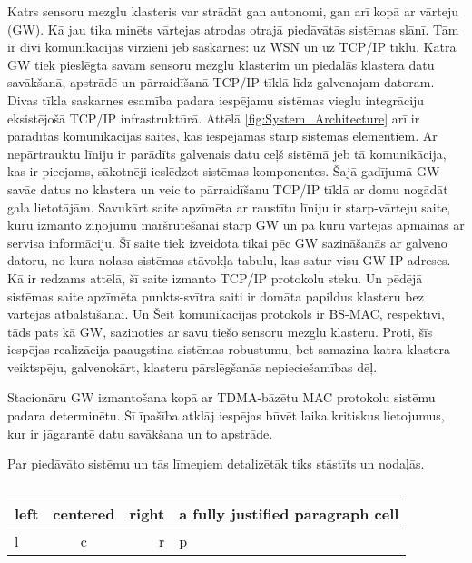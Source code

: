 Katrs sensoru mezglu klasteris var strādāt gan autonomi, gan arī kopā ar vārteju (GW). Kā jau tika minēts vārtejas atrodas otrajā piedāvātās sistēmas slānī. Tām ir divi komunikācijas virzieni jeb saskarnes: uz WSN un uz TCP/IP tīklu. Katra GW tiek pieslēgta savam sensoru mezglu klasterim un piedalās klastera datu savākšanā, apstrādē un pārraidīšanā TCP/IP tīklā līdz galvenajam datoram. Divas tīkla saskarnes esamība padara iespējamu sistēmas vieglu integrāciju eksistējošā TCP/IP infrastruktūrā. Attēlā \upshape \ref{fig:System_Architecture} arī ir parādītas komunikācijas saites, kas iespējamas starp sistēmas elementiem. Ar nepārtrauktu līniju ir parādīts galvenais datu ceļš sistēmā jeb tā komunikācija, kas ir pieejams, sākotnēji ieslēdzot sistēmas komponentes. Šajā gadījumā GW savāc datus no klastera un veic to pārraidīšanu TCP/IP tīklā ar domu nogādāt gala lietotājām. Savukārt saite apzīmēta ar raustītu līniju ir starp-vārteju saite, kuru izmanto ziņojumu maršrutēšanai starp GW un pa kuru vārtejas apmainās ar servisa informāciju. Šī saite tiek izveidota tikai pēc GW sazināšanās ar galveno datoru, no kura nolasa sistēmas stāvokļa tabulu, kas satur visu GW IP adreses. Kā ir redzams attēlā, šī saite izmanto TCP/IP protokolu steku. Un pēdējā sistēmas saite apzīmēta punkts-svītra saiti ir domāta papildus klasteru bez vārtejas atbalstīšanai. Un Šeit komunikācijas protokols ir BS-MAC, respektīvi, tāds pats kā GW, sazinoties ar savu tiešo sensoru mezglu klasteru. Proti, šīs iespējas realizācija paaugstina sistēmas robustumu, bet samazina katra klastera veiktspēju, galvenokārt, klasteru pārslēgšanās nepieciešamības dēļ. 

 

Stacionāru GW izmantošana kopā ar TDMA-bāzētu MAC protokolu sistēmu padara determinētu. Šī īpašība atklāj iespējas būvēt laika kritiskus lietojumus, kur ir jāgarantē datu savākšana un to apstrāde.

Par piedāvāto sistēmu un tās līmeņiem detalizētāk tiks stāstīts un nodaļās.

\begin{table}
\caption{\textbf{\fontsize{11}{12}\selectfont {\\ \LaTeX\ font selection}}} 
\label{table:kysymys}
\centering
	\begin{tabular}{|l|c|r|p{5cm}|}
	  \hline
	left & centered & right & a fully justified paragraph cell\\
	\hline
	  l & c & r & p\\
	  \hline
	\end{tabular}
\end{table}

